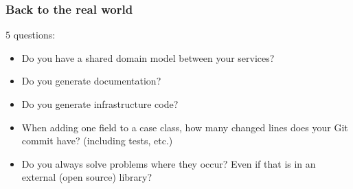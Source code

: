 \documentclass[aspectratio=169]{beamer}
\begin{document}
\begin{frame}
\frametitle{Back to the real world}

5 questions:\pause
\begin{itemize}
\item Do you have a shared domain model between your services? \pause
\item Do you generate documentation? \pause
\item Do you generate infrastructure code? \pause
\item When adding one field to a case class, how many changed lines does your Git commit have? (including tests, etc.) \pause
\item Do you always solve problems where they occur? \pause Even if that is in an external (open source) library?
\end{itemize}


\end{frame}
\end{document}
